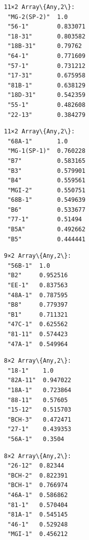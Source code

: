 \documentclass[11pt]{article}
\begin{document}
    
    \begin{Verbatim}[commandchars=\\\{\}]
11×2 Array\{Any,2\}:
 "MG-2(SP-2)"  1.0
 "56-1"        0.833071
 "18-31"       0.803582
 "18B-31"      0.79762
 "64-1"        0.771609
 "57-1"        0.731212
 "17-31"       0.675958
 "81B-1"       0.638129
 "18D-31"      0.542359
 "55-1"        0.482608
 "22-13"       0.384279
    \end{Verbatim}

    
    
    \begin{Verbatim}[commandchars=\\\{\}]
11×2 Array\{Any,2\}:
 "68A-1"       1.0
 "MG-1(SP-1)"  0.760228
 "B7"          0.583165
 "B3"          0.579901
 "B4"          0.559561
 "MGI-2"       0.550751
 "68B-1"       0.549639
 "B6"          0.533677
 "77-1"        0.51494
 "B5A"         0.492662
 "B5"          0.444441
    \end{Verbatim}

    
    
    \begin{Verbatim}[commandchars=\\\{\}]
9×2 Array\{Any,2\}:
 "56B-1"  1.0
 "B2"     0.952516
 "EE-1"   0.837563
 "48A-1"  0.787595
 "B8"     0.779397
 "B1"     0.711321
 "47C-1"  0.625562
 "81-11"  0.574423
 "47A-1"  0.549964
    \end{Verbatim}

    
    
    \begin{Verbatim}[commandchars=\\\{\}]
8×2 Array\{Any,2\}:
 "18-1"    1.0
 "82A-11"  0.947022
 "18A-1"   0.723864
 "88-11"   0.57605
 "15-12"   0.515703
 "BCH-3"   0.472471
 "27-1"    0.439353
 "56A-1"   0.3504
    \end{Verbatim}

    
    
    \begin{Verbatim}[commandchars=\\\{\}]
8×2 Array\{Any,2\}:
 "26-12"  0.82344
 "BCH-2"  0.822391
 "BCH-1"  0.766974
 "46A-1"  0.586862
 "81-1"   0.570404
 "81A-1"  0.545145
 "46-1"   0.529248
 "MGI-1"  0.456212
    \end{Verbatim}

    
    \begin{center}
    \end{center}
    { \hspace*{\fill} \\}
    
\end{document}
